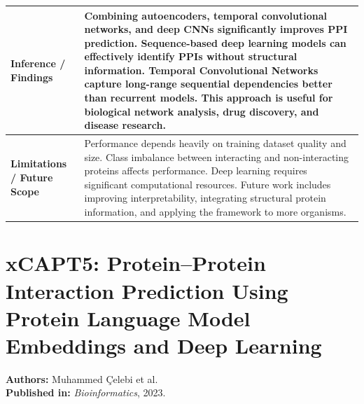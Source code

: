 \documentclass[12pt,a4paper]{report}
\begin{document}
\begin{table}[H]
\centering
\renewcommand{\arraystretch}{1.5}
\begin{tabular}{|p{}|p{}|}
\hline
\textbf{Inference / Findings} & Combining autoencoders, temporal convolutional networks, and deep CNNs significantly improves PPI prediction. Sequence-based deep learning models can effectively identify PPIs without structural information. Temporal Convolutional Networks capture long-range sequential dependencies better than recurrent models. This approach is useful for biological network analysis, drug discovery, and disease research. \\ \hline
\textbf{Limitations / Future Scope} & Performance depends heavily on training dataset quality and size. Class imbalance between interacting and non-interacting proteins affects performance. Deep learning requires significant computational resources. Future work includes improving interpretability, integrating structural protein information, and applying the framework to more organisms. \\ \hline
\end{tabular}
\end{table}

\newpage

\section{xCAPT5: Protein–Protein Interaction Prediction Using Protein Language Model Embeddings and Deep Learning}
\textbf{Authors:} Muhammed \c{C}elebi et al. \\
\textbf{Published in:} \textit{Bioinformatics}, 2023.
\end{document}
